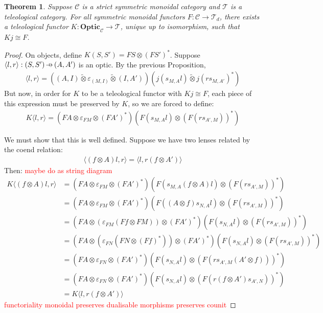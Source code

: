 \documentclass[11pt,a4paper]{article}
\theoremstyle{plain}
\newtheorem{theorem}{Theorem}[subsection]
\theoremstyle{definition}
\newcommand{\C}{\mathscr{C}}
\newcommand{\T}{\mathscr{T}}
\newcommand{\Optic}{\mathbf{Optic}}
\newcommand{\switched}{\mathbin{\tilde{\otimes}}}
\newcommand{\hto}{\ensuremath{\,\mathaccent\shortmid\rightarrow\,}}
\newcommand{\todo}[1]{\textcolor{red}{\small #1}}
\begin{document}
\begin{theorem}
  \label{optic-is-free-teleological-cat}
  Suppose $\C$ is a strict symmetric monoidal category and $\T$ is a teleological category. For all symmetric monoidal functors $F : \C \to \T_d$, there exists a teleological functor $K : \Optic_\C \to \T$, unique up to isomorphism, such that $Kj \cong F$.
\end{theorem}
\begin{proof}
  On objects, define $K(S, S') = FS \otimes (FS')^*$. Suppose $\langle l, r \rangle : (S, S') \hto (A, A')$ is an optic. By the previous Proposition,
  \begin{align*}
    \langle l, r \rangle = ((A, I) \switched \varepsilon_{(M, I)} \switched (I, A'))(j(s_{M,A}l) \switched j(rs_{M,A'})^*)
  \end{align*}
  But now, in order for $K$ to be a teleological functor with $Kj \cong F$, each piece of this expression must be preserved by $K$, so we are forced to define:
  \begin{align*}
    K\langle l, r \rangle = (FA \otimes \varepsilon_{FM} \otimes (FA')^*)(F(s_{M,A}l) \otimes (F(rs_{A', M}))^* )
  \end{align*}

  We must show that this is well defined. Suppose we have two lenses related by the coend relation:
  \begin{align*}
    \langle (f \otimes A) l, r \rangle = \langle l, r (f \otimes A') \rangle
  \end{align*}
  Then: \todo{maybe do as string diagram}
  \begin{align*}
    K\langle (f \otimes A) l, r \rangle
    &= (FA \otimes \varepsilon_{FM} \otimes (FA')^*)(F(s_{M,A}(f \otimes A)l) \otimes (F(rs_{A',M}))^* ) \\
    &= (FA \otimes \varepsilon_{FM} \otimes (FA')^*)(F((A \otimes f)s_{N,A}l) \otimes (F(rs_{A',M}))^* ) \\
    &= (FA \otimes (\varepsilon_{FM} (Ff \otimes FM)) \otimes (FA')^*)(F(s_{N,A}l) \otimes (F(rs_{A',M}))^* ) \\
    &= (FA \otimes (\varepsilon_{FN} (FN \otimes (Ff)^*)) \otimes (FA')^*)(F(s_{N,A}l) \otimes (F(rs_{A',M}))^* ) \\
    &= (FA \otimes \varepsilon_{FN} \otimes (FA')^*)(F(s_{N,A}l) \otimes (F(rs_{A',M}(A' \otimes f)))^* ) \\
    &= (FA \otimes \varepsilon_{FN} \otimes (FA')^*)(F(s_{N,A}l) \otimes (F(r(f \otimes A')s_{A',N}))^* ) \\
    &= K\langle  l, r (f \otimes A') \rangle
  \end{align*}
  \todo{functoriality} \todo{monoidal} \todo{preserves dualisable morphisms} \todo{preserves counit}
\end{proof}
\end{document}
